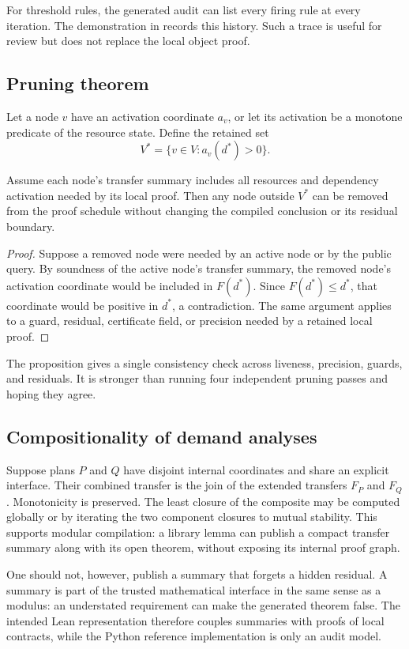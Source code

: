 For threshold rules, the generated audit can list every firing rule at every
iteration.  The demonstration in  records this
history.  Such a trace is useful for review but does not replace the local
object proof.

\subsection{Pruning theorem}

Let a node \(v\) have an activation coordinate \(a_v\), or let its activation
be a monotone predicate of the resource state.  Define the retained set
\[
  V^*=\{v\in V: a_v(d^*)>0\}.
\]

\begin{proposition}
\label{prop:dead-node}
Assume each node's transfer summary includes all resources and dependency
activation needed by its local proof.  Then any node outside \(V^*\) can be
removed from the proof schedule without changing the compiled conclusion or
its residual boundary.
\end{proposition}

\begin{proof}
Suppose a removed node were needed by an active node or by the public query.
By soundness of the active node's transfer summary, the removed node's
activation coordinate would be included in \(F(d^*)\).  Since
\(F(d^*)\le d^*\), that coordinate would be positive in \(d^*\), a
contradiction.  The same argument applies to a guard, residual, certificate
field, or precision needed by a retained local proof.
\end{proof}

The proposition gives a single consistency check across liveness, precision,
guards, and residuals.  It is stronger than running four independent pruning
passes and hoping they agree.

\subsection{Compositionality of demand analyses}

Suppose plans \(P\) and \(Q\) have disjoint internal coordinates and share an
explicit interface.  Their combined transfer is the join of the extended
transfers \(F_P\) and \(F_Q\).  Monotonicity is preserved.  The least closure
of the composite may be computed globally or by iterating the two component
closures to mutual stability.  This supports modular compilation: a library
lemma can publish a compact transfer summary along with its open theorem,
without exposing its internal proof graph.

One should not, however, publish a summary that forgets a hidden residual.  A
summary is part of the trusted mathematical interface in the same sense as a
modulus: an understated requirement can make the generated theorem false.
The intended Lean representation therefore couples summaries with proofs of
local contracts, while the Python reference implementation is only an audit
model.
